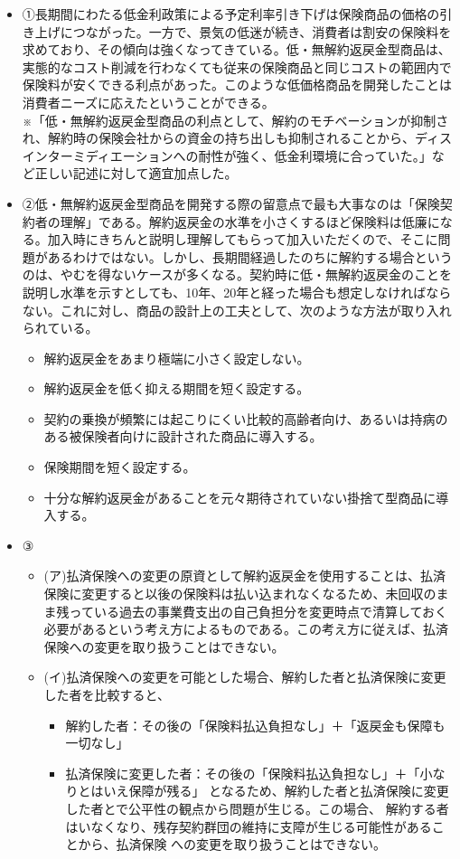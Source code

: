 \documentclass[report,gutter=10mm,fore-edge=10mm,uplatex,dvipdfmx]{jlreq}
\begin{document}
\begin{itemize}
 \item  ①長期間にわたる低金利政策による予定利率引き下げは保険商品の価格の引き上げにつながった。一方で、景気の低迷が続き、消費者は割安の保険料を求めており、その傾向は強くなってきている。低・無解約返戻金型商品は、実態的なコスト削減を行わなくても従来の保険商品と同じコストの範囲内で保険料が安くできる利点があった。このような低価格商品を開発したことは消費者ニーズに応えたということができる。\\
※「低・無解約返戻金型商品の利点として、解約のモチベーションが抑制され、解約時の保険会社からの資金の持ち出しも抑制されることから、ディスインターミディエーションへの耐性が強く、低金利環境に合っていた。」など正しい記述に対して適宜加点した。

 \item  ②低・無解約返戻金型商品を開発する際の留意点で最も大事なのは「保険契約者の理解」である。解約返戻金の水準を小さくするほど保険料は低廉になる。加入時にきちんと説明し理解してもらって加入いただくので、そこに問題があるわけではない。しかし、長期間経過したのちに解約する場合というのは、やむを得ないケースが多くなる。契約時に低・無解約返戻金のことを説明し水準を示すとしても、10年、20年と経った場合も想定しなければならない。これに対し、商品の設計上の工夫として、次のような方法が取り入れられている。
\begin{itemize}
 \item 解約返戻金をあまり極端に小さく設定しない。
 \item 解約返戻金を低く抑える期間を短く設定する。
 \item 契約の乗換が頻繁には起こりにくい比較的高齢者向け、あるいは持病のある被保険者向けに設計された商品に導入する。
 \item 保険期間を短く設定する。
 \item 十分な解約返戻金があることを元々期待されていない掛捨て型商品に導入する。
\end{itemize} 
 \item ③
\begin{itemize}
 \item  (ア)払済保険への変更の原資として解約返戻金を使用することは、払済保険に変更すると以後の保険料は払い込まれなくなるため、未回収のまま残っている過去の事業費支出の自己負担分を変更時点で清算しておく必要があるという考え方によるものである。この考え方に従えば、払済保険への変更を取り扱うことはできない。
 \item (イ)払済保険への変更を可能とした場合、解約した者と払済保険に変更した者を比較すると、
\begin{itemize}
 \item 解約した者：その後の「保険料払込負担なし」＋「返戻金も保障も一切なし」
 \item 払済保険に変更した者：その後の「保険料払込負担なし」＋「小なりとはいえ保障が残る」 となるため、解約した者と払済保険に変更した者とで公平性の観点から問題が生じる。この場合、 解約する者はいなくなり、残存契約群団の維持に支障が生じる可能性があることから、払済保険 への変更を取り扱うことはできない。
\end{itemize}
\end{itemize}
\end{itemize}
\end{document}
